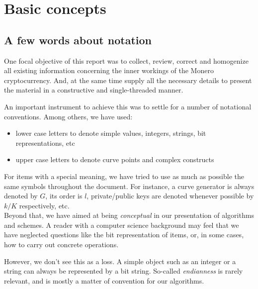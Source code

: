 



\chapter{Basic concepts}
\label{chap:basicConcepts}


\section{A few words about notation}

One focal objective of this report was to collect, review, correct and homogenize all existing information concerning the inner workings of the Monero cryptocurrency. And, at the same time supply all the necessary details to present the material in a constructive and single-threaded manner.

An important instrument to achieve this was to settle for a number of notational conventions. Among others, we have used:

\begin{itemize}
\item lower case letters to denote simple values, integers, strings, bit representations, etc
\item upper case letters to denote curve points and complex constructs
\end{itemize}

For items with a special meaning, we have tried to use as much as possible the same symbols throughout the document. For instance, a curve generator is always denoted by \(G\), its order is \(l\), private/public keys are denoted whenever possible by \(k/K\) respectively, etc.
\\

Beyond that, we have aimed at being {\em conceptual} in our presentation of algorithms and schemes. A reader with a computer science background may feel that we have neglected questions like the bit representation of items, or, in some cases, how to carry out concrete operations.

However, we don’t see this as a loss. A simple object such as an integer or a string can always be represented by a bit string. So-called {\em endianness} is rarely relevant, and is mostly a matter of convention for our algorithms.

